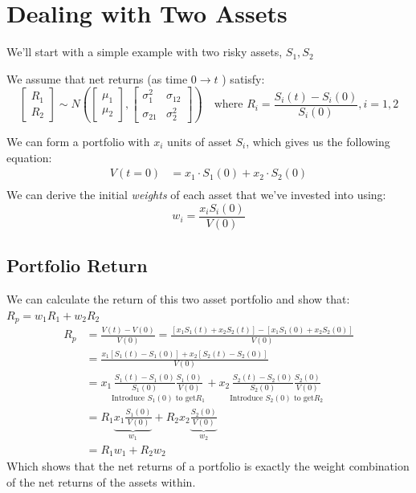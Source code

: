 \documentclass[
  oneside]{book}
\begin{document}
\hypertarget{dealing-with-two-assets}{%
\section{Dealing with Two Assets}\label{dealing-with-two-assets}}

We'll start with a simple example with two risky assets, \(S_{1}, S_{2}\)

We assume that net returns (as time \(0\to t\) ) satisfy:
\[
\left[\begin{array}{c}
R_{1} \\
R_{2}
\end{array}\right] \sim 
N \left( 
\left[ \begin{array}{c}
\mu_{1} \\
\mu_{2}
\end{array} 
\right],
\left[
\begin{array}{cc}
\sigma_{1}^{2}  & \sigma_{12} \\
\sigma_{21}  & \sigma^{2}_{2}
\end{array} \right] 
\right) \quad 
\text{where } R_{i} = \frac{S_{i}(t)-S_{i}(0)}{S_{i}(0)}, i = 1,2
\]

We can form a portfolio with \(x_{i}\) units of asset \(S_{i}\), which gives us the following equation:
\[
\begin{aligned}
V(t=0) &= x_{1}\cdot S_{1}(0)+x_{2}\cdot S_{2}(0)\\
\end{aligned}
\]
We can derive the initial \emph{weights} of each asset that we've invested into using:
\[
w_{i} = \frac{x_{i}S_{i}(0)}{V(0)}
\]

\hypertarget{portfolio-return}{%
\subsection{Portfolio Return}\label{portfolio-return}}

We can calculate the return of this two asset portfolio and show that: \(R_{p} = w_{1}R_{1}+w_{2}R_{2}\)
\[
\begin{aligned}
R_{p} &= \frac{V(t)-V(0)}{V(0)} = \frac{[x_{1}S_{1}(t)+x_{2}S_{2}(t)]-[x_{1}S_{1}(0)+x_{2}S_{2}(0)]}{V(0)}\\
&= \frac{x_{1}[S_{1}(t)-S_{1}(0)]+x_{2}[S_{2}(t)-S_{2}(0)]}{V(0)}\\
&= x_{1} \underset{ \text{Introduce }S_{1}(0) \text{ to get} R_{1}}{ \frac{S_{1}(t)-S_{1}(0)}{S_{1}(0)} \frac{S_{1}(0)}{V(0)} } + x_{2} \underset{  \text{Introduce }S_{2}(0) \text{ to get} R_{2} }{ \frac{S_{2}(t)-S_{2}(0)}{S_{2}(0)} \frac{S_{2}(0)}{V(0)} }\\
&= R_{1} \underbrace{ x_{1}\frac{S_{1}(0)}{V(0)} }_{ w_{1} }+R_{2} x_{2}\underbrace{ \frac{S_{2}(0)}{V(0)} }_{ w_{2} }\\
&= R_{1}w_{1}+R_{2}w_{2}
\end{aligned}
\]
Which shows that the net returns of a portfolio is exactly the weight combination of the net returns of the assets within.
\end{document}
